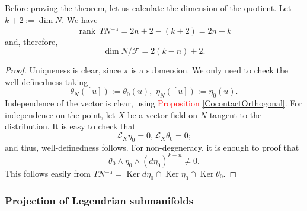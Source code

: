 \documentclass[12pt]{article}
\renewcommand{\dim}{\operatorname{dim}}
\renewcommand{\ker}{\operatorname{Ker}}
\begin{document}
Before proving the theorem, let us calculate the dimension of the quotient. Let $k + 2:= \dim N$. We have $$\operatorname{rank}\, TN^{\perp_\Lambda} = 2n + 2 - (k + 2) = 2n - k$$ and, therefore, $$\dim N/\mathcal{F} = 2(k - n) + 2.$$

\begin{proof} Uniqueness is clear, since $\pi$ is a submersion. We only need to check the well-definedness taking $$\theta_N([u]) := \theta_0(u), \,\, \eta_N([u]):= \eta_0(u).$$ Independence of the vector is clear, using \textcolor{red}{Proposition \ref{CocontactOrthogonal}}. For independence on the point, let $X$ be a vector field on $N$ tangent to the distribution. It is easy to check that $$\mathcal{L}_X \eta_0 = 0 , \mathcal{L}_X \theta_0 = 0;$$ and thus, well-definedness follows. For non-degeneracy, it is enough to proof that $$\theta_0 \wedge \eta_0 \wedge (d\eta_0)^{k-n} \neq 0.$$ This follows easily from $TN^{\perp_\Lambda} = \ker d\eta_0 \cap \ker \eta_0 \cap \ker \theta_0.$
\end{proof}

\subsubsection{Projection of Legendrian submanifolds}
\end{document}
